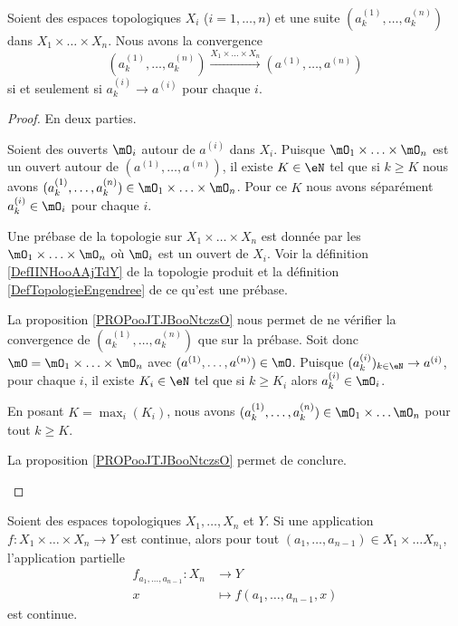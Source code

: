 \begin{proposition}
	Soient des espaces topologiques \( X_i\) (\( i=1,\ldots, n\)) et une suite \( (a^{(1)}_k,\ldots, a^{(n)}_k)\) dans \( X_1\times\ldots \times X_n\). Nous avons la convergence
	\begin{equation}
		(a^{(1)}_k,\ldots, a^{(n)}_k)\stackrel{X_1\times\ldots \times X_n}{\longrightarrow}(a^{(1)},\ldots, a^{(n)})
	\end{equation}
	si et seulement si \( a^{(i)}_k\to a^{(i)}\) pour chaque \( i\).
\end{proposition}

\begin{proof}
	En deux parties.
	\begin{subproof}
		Soient des ouverts \( \mO_i\) autour de \( a^{(i)}\) dans \( X_i\). Puisque \( \mO_1\times \ldots\times \mO_n\) est un ouvert autour de \( (a^{(1)},\ldots, a^{(n)})\), il existe \( K\in \eN\) tel que si \( k\geq K\) nous avons \( (a^{(1)}_k,\ldots, a^{(n)}_k)\in \mO_1\times \ldots \times \mO_n\). Pour ce \( K\) nous avons séparément \( a^{(i)}_k\in \mO_i\) pour chaque \( i\).

		Une prébase de la topologie sur \( X_1\times \ldots\times X_n\) est donnée par les \( \mO_1\times \ldots \times \mO_n\) où \( \mO_i\) est un ouvert de \( X_i\). Voir la définition \ref{DefIINHooAAjTdY} de la topologie produit et la définition \ref{DefTopologieEngendree} de ce qu'est une prébase.

		La proposition \ref{PROPooJTJBooNtczsO} nous permet de ne vérifier la convergence de \( (a^{(1)}_k,\ldots, a^{(n)}_k)\) que sur la prébase. Soit donc \(\mO= \mO_1\times \ldots \times \mO_n\) avec \( (a^{(1)},\ldots, a^{(n)})\in \mO\). Puisque \( (a^{(i)}_k)_{k\in \eN}\to a^{(i)}\), pour chaque \( i\), il existe \( K_i\in \eN\) tel que si \( k\geq K_i\) alors \( a^{(i)}_k\in \mO_i\).

		En posant \( K=\max_i(K_i)\), nous avons \( (a^{(1)}_k,\ldots, a^{(n)}_k)\in \mO_1\times \ldots \mO_n\) pour tout \( k\geq K\).

		La proposition \ref{PROPooJTJBooNtczsO} permet de conclure.
	\end{subproof}
\end{proof}


\begin{lemma}	\label{LEMooRTWNooMZTWgS}
	Soient des espaces topologiques \( X_1,\ldots,X_n\) et \( Y\). Si une application \(f \colon X_1\times\ldots \times X_n\to Y  \) est continue, alors pour tout \( (a_1,\ldots,a_{n-1})\in X_1\times\ldots X_{n_1}\), l'application partielle
	\begin{equation}
		\begin{aligned}
			f_{a_1,\ldots,a_{n-1}}\colon X_n & \to Y                           \\
			x                                & \mapsto f(a_1,\ldots,a_{n-1},x)
		\end{aligned}
	\end{equation}
	est continue.
\end{lemma}

